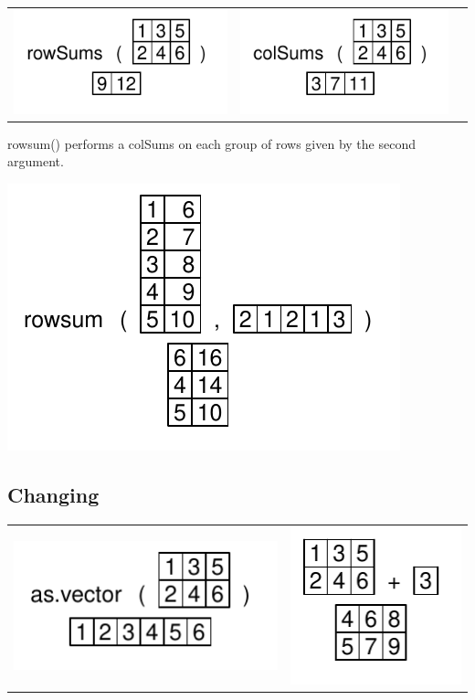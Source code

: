\documentclass[pdflatex]{article}
\begin{document}
\begin{tabular}{ccc}
\includegraphics{rowSums} & \includegraphics{colSums}
\end{tabular}

rowsum() performs a colSums on each group of rows given by the second argument.

\includegraphics{rowsum} 

\subsection{Changing}

\begin{tabular}{cc}
\includegraphics{as_vector} & \includegraphics{matrix_operator}\\
\end{tabular}
\end{document}
